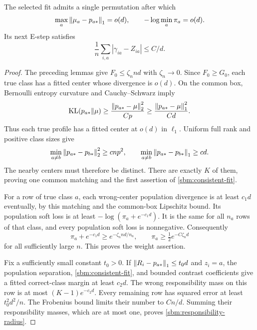 \begin{lemma}
\label{sbm:responsibilities}
The selected fit admits a single permutation after which
\begin{equation}
 \max_a\left\lVert\mu_a-p_{a*}\right\rVert_1=o(d),\qquad
 -\log\min_a\pi_a=o(d).
 \label{sbm:consistent-fit}
\end{equation}
Its next E-step satisfies
\begin{equation}
 \frac1n\sum_{i,a}|\gamma_{ia}-Z_{ia}|\le C/d.
 \label{sbm:responsibility-radius}
\end{equation}
\end{lemma}

\begin{proof}
The preceding lemmas give $F_0\le\zeta_nnd$ with $\zeta_n\to0$.
Since $F_0\ge G_0$, each true class has a fitted center whose
divergence is $o(d)$. On the common box, Bernoulli entropy curvature
and Cauchy--Schwarz imply
\[
 \operatorname{KL}(p_{a*}\Vert\mu)\ge
 \frac{\left\lVert p_{a*}-\mu\right\rVert_2^2}{Cp}
 \ge\frac{\left\lVert p_{a*}-\mu\right\rVert_1^2}{Cd}.
\]
Thus each true profile has a fitted center at $o(d)$ in $\ell_1$.
Uniform full rank and positive class sizes give
\[
 \min_{a\ne b}\left\lVert p_{a*}-p_{b*}\right\rVert_2^2\ge cnp^2,
 \qquad
 \min_{a\ne b}\left\lVert p_{a*}-p_{b*}\right\rVert_1\ge cd.
\]
The nearby centers must therefore be distinct. There are exactly $K$
of them, proving one common matching and the first assertion of
\eqref{sbm:consistent-fit}.

For a row of true class $a$, each wrong-center population divergence
is at least $c_1d$ eventually, by this matching and the common-box
Lipschitz bound. Its population soft loss is at least
$-\log(\pi_a+e^{-c_1d})$. It is the same for all $n_a$ rows of that
class, and every population soft loss is nonnegative. Consequently
\[
 \pi_a+e^{-c_1d}\ge e^{-\zeta_nnd/n_a},\qquad
 \pi_a\ge\tfrac12e^{-C\zeta_nd}
\]
for all sufficiently large $n$. This proves the weight assertion.

Fix a sufficiently small constant $t_0>0$. If
$\left\lVert R_i-p_{a*}\right\rVert_1\le t_0d$ and $z_i=a$, the population separation,
\eqref{sbm:consistent-fit}, and bounded contrast coefficients give
a fitted correct-class margin at least $c_2d$. The wrong responsibility
mass on this row is at most $(K-1)e^{-c_2d}$. Every remaining row has
squared error at least $t_0^2d^2/n$. The Frobenius bound limits their
number to $Cn/d$. Summing their responsibility masses, which are at
most one, proves \eqref{sbm:responsibility-radius}.
\end{proof}

